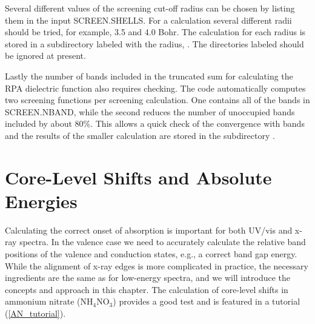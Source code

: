 \documentclass[11pt]{report}
\begin{document}
Several different values of the screening cut-off radius can be chosen by listing them in the input SCREEN.SHELLS. For a calculation several different radii should be tried, for example, 3.5 and 4.0 Bohr. The calculation for each radius is stored in a subdirectory labeled with the radius, . The directories labeled  should be ignored at present. 

Lastly the number of bands included in the truncated sum for calculating the RPA dielectric function also requires checking. The code automatically computes two screening functions per screening calculation. One contains all of the bands in SCREEN.NBAND, while the second reduces the number of unoccupied bands included by about 80\%. This allows a quick check of the convergence with bands and the results of the smaller calculation are stored in the subdirectory .


\chapter{Core-Level Shifts and Absolute Energies}

Calculating the correct onset of absorption is important for both UV/vis and x-ray spectra. 
In the valence case we need to accurately calculate the relative band positions of the valence and conduction states, e.g., a correct band gap energy. 
While the alignment of x-ray edges is more complicated in practice, the necessary ingredients are the same as for  low-energy spectra, and we will introduce the concepts and approach in this chapter. 
The calculation of core-level shifts in ammonium nitrate (NH$_4$NO$_3$) provides a good test and is featured in a tutorial (\ref{AN_tutorial}). 
\end{document}
